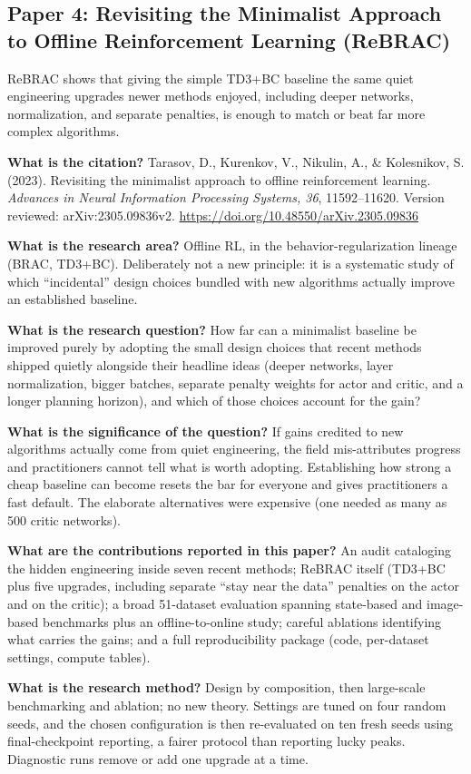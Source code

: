 \documentclass[11pt]{article}
\newcommand{\paper}[1]{\subsection*{#1}}
\newcommand{\q}[2]{\item \textbf{#1} #2}
\begin{document}
\paper{Paper 4: Revisiting the Minimalist Approach to Offline Reinforcement Learning (ReBRAC)}
ReBRAC shows that giving the simple TD3+BC baseline the same quiet engineering upgrades newer methods enjoyed, including deeper networks, normalization, and separate penalties, is enough to match or beat far more complex algorithms.
\begin{qna}

\q{What is the citation?}
Tarasov, D., Kurenkov, V., Nikulin, A., \& Kolesnikov, S. (2023). Revisiting the minimalist approach to offline reinforcement learning. \emph{Advances in Neural Information Processing Systems, 36}, 11592--11620. Version reviewed: arXiv:2305.09836v2. \url{https://doi.org/10.48550/arXiv.2305.09836}

\q{What is the research area?}
Offline RL, in the behavior-regularization lineage (BRAC, TD3+BC). Deliberately not a new principle: it is a systematic study of which ``incidental'' design choices bundled with new algorithms actually improve an established baseline.

\q{What is the research question?}
How far can a minimalist baseline be improved purely by adopting the small design choices that recent methods shipped quietly alongside their headline ideas (deeper networks, layer normalization, bigger batches, separate penalty weights for actor and critic, and a longer planning horizon), and which of those choices account for the gain?

\q{What is the significance of the question?}
If gains credited to new algorithms actually come from quiet engineering, the field mis-attributes progress and practitioners cannot tell what is worth adopting. Establishing how strong a cheap baseline can become resets the bar for everyone and gives practitioners a fast default. The elaborate alternatives were expensive (one needed as many as 500 critic networks).

\q{What are the contributions reported in this paper?}
An audit cataloging the hidden engineering inside seven recent methods; ReBRAC itself (TD3+BC plus five upgrades, including separate ``stay near the data'' penalties on the actor and on the critic); a broad 51-dataset evaluation spanning state-based and image-based benchmarks plus an offline-to-online study; careful ablations identifying what carries the gains; and a full reproducibility package (code, per-dataset settings, compute tables).

\q{What is the research method?}
Design by composition, then large-scale benchmarking and ablation; no new theory. Settings are tuned on four random seeds, and the chosen configuration is then re-evaluated on ten fresh seeds using final-checkpoint reporting, a fairer protocol than reporting lucky peaks. Diagnostic runs remove or add one upgrade at a time.


\end{qna}
\end{document}
